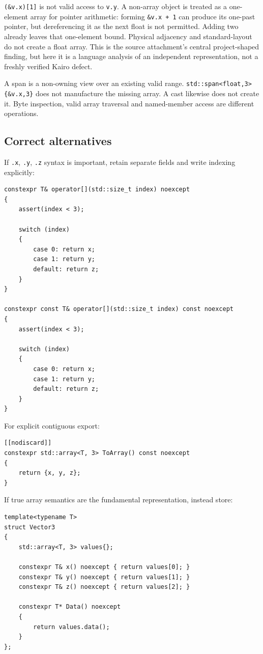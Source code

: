 \texttt{(\&v.x){[}1{]}} is not valid access to \texttt{v.y}. A non-array object is treated as a one-element array for pointer arithmetic: forming \texttt{\&v.x\ +\ 1} can produce its one-past pointer, but dereferencing it as the next float is not permitted. Adding two already leaves that one-element bound. Physical adjacency and standard-layout do not create a float array. This is the source attachment's central project-shaped finding, but here it is a language analysis of an independent representation, not a freshly verified Kairo defect.

A span is a non-owning view over an existing valid range. \texttt{std::span\textless{}float,3\textgreater{}\{\&v.x,3\}} does not manufacture the missing array. A cast likewise does not create it. Byte inspection, valid array traversal and named-member access are different operations.

\subsection{Correct alternatives}\label{01-foundations-i-ch003-correct-alternatives}

\hypertarget{01-foundations-i-ch003-correct-alternatives}{}

If \texttt{.x}, \texttt{.y}, \texttt{.z} syntax is important, retain separate fields and write indexing explicitly:

\begin{verbatim}
constexpr T& operator[](std::size_t index) noexcept
{
    assert(index < 3);

    switch (index)
    {
        case 0: return x;
        case 1: return y;
        default: return z;
    }
}

constexpr const T& operator[](std::size_t index) const noexcept
{
    assert(index < 3);

    switch (index)
    {
        case 0: return x;
        case 1: return y;
        default: return z;
    }
}
\end{verbatim}

For explicit contiguous export:

\begin{verbatim}
[[nodiscard]]
constexpr std::array<T, 3> ToArray() const noexcept
{
    return {x, y, z};
}
\end{verbatim}

If true array semantics are the fundamental representation, instead store:

\begin{verbatim}
template<typename T>
struct Vector3
{
    std::array<T, 3> values{};

    constexpr T& x() noexcept { return values[0]; }
    constexpr T& y() noexcept { return values[1]; }
    constexpr T& z() noexcept { return values[2]; }

    constexpr T* Data() noexcept
    {
        return values.data();
    }
};
\end{verbatim}

